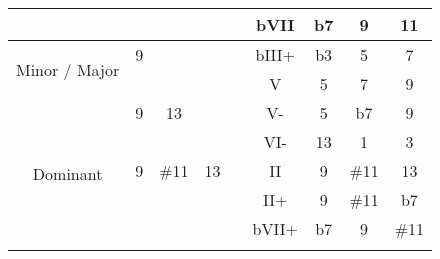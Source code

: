 \documentclass[10pt,a4paper]{article}
\begin{document}
\begin{table}[]
\begin{tabular}{ccccccccc}
\multicolumn{1}{|c|}{}                                 & \multicolumn{1}{c|}{}   & \multicolumn{1}{c|}{}     & \multicolumn{1}{c|}{}   & \multicolumn{1}{c|}{}    & \multicolumn{1}{c|}{bVII}                  & \multicolumn{1}{c|}{b7}  & \multicolumn{1}{c|}{9}    & \multicolumn{1}{c|}{11}   \\ \hline
\multicolumn{1}{|c|}{\multirow{2}{*}{Minor / Major}}   & \multicolumn{1}{c|}{9}  & \multicolumn{1}{c|}{}     & \multicolumn{1}{c|}{}   & \multicolumn{1}{c|}{}    & \multicolumn{1}{c|}{bIII+}                 & \multicolumn{1}{c|}{b3}  & \multicolumn{1}{c|}{5}    & \multicolumn{1}{c|}{7}    \\ \cline{2-9} 
\multicolumn{1}{|c|}{}                                 & \multicolumn{1}{c|}{}   & \multicolumn{1}{c|}{}     & \multicolumn{1}{c|}{}   & \multicolumn{1}{c|}{}    & \multicolumn{1}{c|}{V}                     & \multicolumn{1}{c|}{5}   & \multicolumn{1}{c|}{7}    & \multicolumn{1}{c|}{9}    \\ \hline
\multicolumn{1}{|c|}{\multirow{12}{*}{Dominant}}       & \multicolumn{1}{c|}{9}  & \multicolumn{1}{c|}{13}   & \multicolumn{1}{c|}{}   & \multicolumn{1}{c|}{}    & \multicolumn{1}{c|}{V-}                    & \multicolumn{1}{c|}{5}   & \multicolumn{1}{c|}{b7}   & \multicolumn{1}{c|}{9}    \\ \cline{2-9} 
\multicolumn{1}{|c|}{}                                 & \multicolumn{1}{c|}{}   & \multicolumn{1}{c|}{}     & \multicolumn{1}{c|}{}   & \multicolumn{1}{c|}{}    & \multicolumn{1}{c|}{VI-}                   & \multicolumn{1}{c|}{13}  & \multicolumn{1}{c|}{1}    & \multicolumn{1}{c|}{3}    \\ \cline{2-9} 
\multicolumn{1}{|c|}{}                                 & \multicolumn{1}{c|}{9}  & \multicolumn{1}{c|}{\#11} & \multicolumn{1}{c|}{13} & \multicolumn{1}{c|}{}    & \multicolumn{1}{c|}{II}                    & \multicolumn{1}{c|}{9}   & \multicolumn{1}{c|}{\#11} & \multicolumn{1}{c|}{13}   \\ \cline{2-9} 
\multicolumn{1}{|c|}{}                                 & \multicolumn{1}{c|}{}   & \multicolumn{1}{c|}{}     & \multicolumn{1}{c|}{}   & \multicolumn{1}{c|}{}    & \multicolumn{1}{c|}{II+}                   & \multicolumn{1}{c|}{9}   & \multicolumn{1}{c|}{\#11} & \multicolumn{1}{c|}{b7}   \\ \cline{2-9} 
\multicolumn{1}{|c|}{}                                 & \multicolumn{1}{c|}{}   & \multicolumn{1}{c|}{}     & \multicolumn{1}{c|}{}   & \multicolumn{1}{c|}{}    & \multicolumn{1}{c|}{bVII+}                 & \multicolumn{1}{c|}{b7}  & \multicolumn{1}{c|}{9}    & \multicolumn{1}{c|}{\#11} \\ \cline{2-9} 

\end{tabular}
\end{table}
\end{document}

